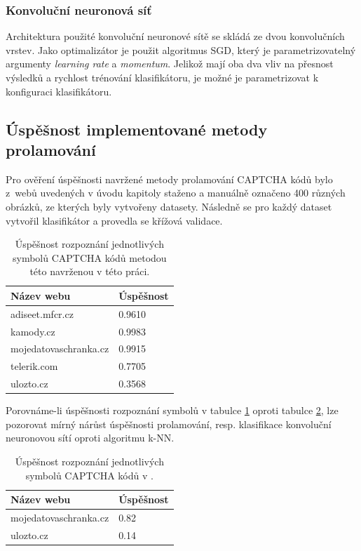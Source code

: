 \documentclass[
  field=ainfp,
  master=true,
  biblatex,
  sourcecodes=false,
  theorems=false,
  glossaries,
  index
]{kidiplom}
\begin{document}
\subsubsection*{Konvoluční neuronová síť}
Architektura použité konvoluční neuronové sítě se skládá ze dvou konvolučních vrstev.
Jako optimalizátor je použit algoritmus SGD, který je parametrizovatelný argumenty \textit{learning rate} a \textit{momentum}. Jelikož mají oba dva vliv na přesnost výsledků a rychlost trénování klasifikátoru, je možné je parametrizovat k konfiguraci klasifikátoru.

\subsection{Úspěšnost implementované metody prolamování}
Pro ověření úspěšnosti navržené metody prolamování CAPTCHA kódů bylo z~webů uvedených v úvodu kapitoly staženo a manuálně označeno 400 různých obrázků, ze kterých byly vytvořeny datasety. Následně se pro každý dataset vytvořil klasifikátor a provedla se křížová validace.  

\begin{table}[H]
\centering
\begin{tabular}{|l|l|}
\hline
\textbf{Název webu} & \textbf{Úspěšnost}
\\ \hline
adiseet.mfcr.cz & 0.9610
\\ \hline
kamody.cz & 0.9983
\\ \hline
mojedatovaschranka.cz & 0.9915
\\ \hline
telerik.com & 0.7705
\\ \hline
ulozto.cz & 0.3568
\\ \hline
\end{tabular}
\caption{Úspěšnost rozpoznání jednotlivých symbolů CAPTCHA kódů metodou této navrženou v této práci.}
\label{succesful_rate_mine}
\end{table}

Porovnáme-li úspěšnosti rozpoznání symbolů v tabulce \ref{succesful_rate_mine} oproti tabulce \ref{succesful_rate_mimic}, lze pozorovat mírný nárůst úspěšnosti prolamování, resp. klasifikace konvoluční neuronovou sítí oproti algoritmu k-NN.

\begin{table}[H]
\centering
\begin{tabular}{|l|l|}
\hline
\textbf{Název webu} & \textbf{Úspěšnost}
\\ \hline
mojedatovaschranka.cz & 0.82
\\ \hline
ulozto.cz & 0.14
\\ \hline
\end{tabular}
\caption{Úspěšnost rozpoznání jednotlivých symbolů CAPTCHA kódů v \citep{Kopp2016HowTM}.}
\label{succesful_rate_mimic}
\end{table}
\end{document}
